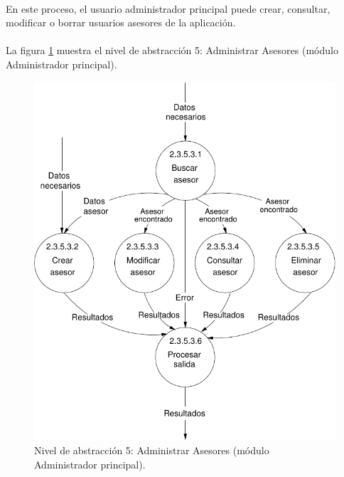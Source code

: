 \paragraph{}En este proceso, el usuario administrador principal puede crear,
consultar, modificar o borrar usuarios asesores de la aplicación.

\paragraph{}La figura \ref{diagramaNivel5-AdministrarAsesores}
muestra el nivel de abstracción 5: Administrar Asesores (módulo Administrador
principal).

  \begin{figure}[!ht]
    \begin{center}
      \includegraphics[]{08.Analisis_Funcional/8.2.DFDs/Niveles/Nivel5/AdministradorPrincipal/AdministrarUsuarios/AdministrarAsesores/Diagramas/nivel5-AdministrarAsesores.pdf}
      \caption{Nivel de abstracción 5: Administrar Asesores (módulo
      Administrador principal).}
      \label{diagramaNivel5-AdministrarAsesores}
    \end{center}
  \end{figure}
